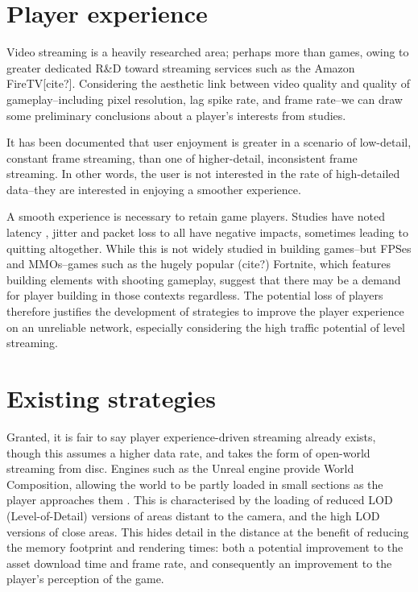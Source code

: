 \documentclass{scrartcl}
\begin{document}
\section{Player experience}
Video streaming is a heavily researched area; perhaps more than games, owing to greater dedicated R\&D toward streaming services such as the Amazon FireTV[cite?]. Considering the aesthetic link between video quality and quality of gameplay--including pixel resolution, lag spike rate, and frame rate--we can draw some preliminary conclusions about a player's interests from studies.

It has been documented \cite{qoelargestudy} that user enjoyment is greater in a scenario of low-detail, constant frame streaming, than one of higher-detail, inconsistent frame streaming. In other words, the user is not interested in the rate of high-detailed data--they are interested in enjoying a smoother experience.

A smooth experience is necessary to retain game players. Studies have noted latency \cite{qossensitivity} \cite{lagragequits}, jitter and packet loss \cite{lagragequits} to all have negative impacts, sometimes leading to quitting altogether. While this is not widely studied in building games--but FPSes and MMOs--games such as the hugely popular (cite?) Fortnite, which features building elements with shooting gameplay, suggest that there may be a demand for player building in those contexts regardless. The potential loss of players therefore justifies the development of strategies to improve the player experience on an unreliable network, especially considering the high traffic potential of level streaming.

\section{Existing strategies}
Granted, it is fair to say player experience-driven streaming already exists, though this assumes a higher data rate, and takes the form of open-world streaming from disc. Engines such as the Unreal engine provide World Composition, allowing the world to be partly loaded in small sections as the player approaches them \cite{unrealcomposition}. This is characterised by the loading of reduced LOD (Level-of-Detail) versions of areas distant to the camera, and the high LOD versions of close areas. This hides detail in the distance at the benefit of reducing the memory footprint and rendering times: both a potential improvement to the asset download time and frame rate, and consequently an improvement to the player's perception of the game.
\end{document}
